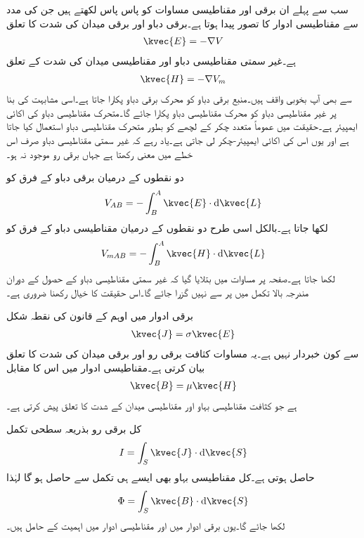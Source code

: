 سب سے پہلے ان برقی اور مقناطیسی مساوات کو پاس پاس لکھتے ہیں جن کی مدد سے مقناطیسی ادوار کا تصور پیدا ہوتا ہے۔برقی دباو اور برقی میدان کی شدت کا تعلق
\begin{align}
\kvec{E}=-\nabla V
\end{align}
ہے۔غیر سمتی مقناطیسی دباو اور مقناطیسی میدان کی شدت کے تعلق
\begin{align}
\kvec{H}=-\nabla V_m
\end{align}
سے بھی آپ بخوبی واقف ہیں۔منبع برقی دباو کو محرک برقی دباو پکارا جاتا ہے۔اسی مشابہت کی بنا پر غیر مقناطیسی  دباو کو محرک مقناطیسی دباو پکارا جائے گا۔متحرک مقناطیسی دباو کی اکائی ایمپیئر ہے۔حقیقت میں عموماً متعدد چکر کے لچھے کو بطور متحرک مقناطیسی دباو استعمال کیا جاتا ہے اور  یوں اس کی اکائی ایمپیئر-چکر لی جاتی ہے۔یاد رہے کہ غیر سمتی مقناطیسی دباو صرف اس خطے میں معنی رکھتا ہے جہاں برقی رو موجود نہ ہو۔

دو نقطوں کے درمیان برقی دباو کے فرق کو
\begin{align}
V_{AB}=-\int_B^A \kvec{E} \cdot \dif \kvec{L}
\end{align}
لکھا جاتا ہے۔بالکل اسی طرح دو نقطوں کے درمیان مقناطیسی دباو کے فرق کو
\begin{align}
V_{mAB}=-\int_B^A \kvec{H} \cdot \dif \kvec{L}
\end{align}
لکھا جاتا ہے۔صفحہ  پر مساوات  میں بتلایا گیا کہ غیر سمتی مقناطیسی دباو کے حصول کے دوران مندرجہ بالا تکمل میں  پر سے نہیں گزرا جائے گا۔اس حقیقت کا خیال رکھنا ضروری ہے۔ 

برقی ادوار میں اوہم  کے قانون کی نقطہ شکل
\begin{align}
\kvec{J}=\sigma \kvec{E}
\end{align}
سے کون خبردار نہیں ہے۔یہ مساوات کثافت برقی رو اور برقی میدان کی شدت کا تعلق بیان کرتی ہے۔مقناطیسی ادوار میں اس کا مقابل
\begin{align}
\kvec{B}=\mu \kvec{H}
\end{align}
ہے جو کثافت مقناطیسی بہاو اور مقناطیسی میدان کے شدت کا تعلق پیش کرتی ہے۔

کل برقی رو بذریعہ سطحی تکمل
\begin{align}
I=\int_S \kvec{J} \cdot \dif \kvec{S}
\end{align}
حاصل ہوتی ہے۔کل مقناطیسی بہاو  بھی ایسے ہی تکمل سے حاصل ہو گا لہٰذا
\begin{align}
\Phi=\int_S \kvec{B} \cdot \dif \kvec{S}
\end{align}
لکھا جائے گا۔یوں برقی ادوار میں  اور مقناطیسی ادوار میں  اہمیت کے حامل ہیں۔

